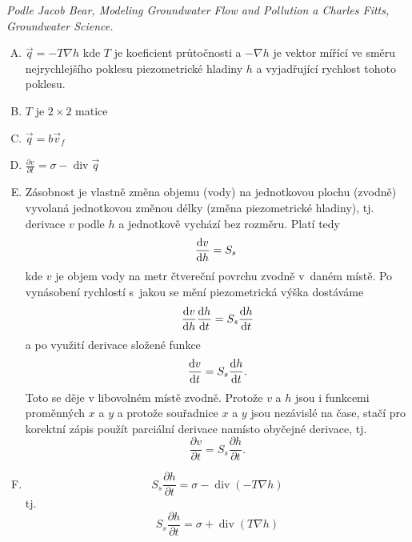 \textit{Podle Jacob Bear, Modeling Groundwater Flow and Pollution a Charles Fitts, Groundwater Science.}

\reseni

\begin{enumerate}[A)]
\item $\vec q=-T \nabla h$ kde $T$ je koeficient průtočnosti a $-\nabla h$
  je vektor mířící ve směru nejrychlejšího poklesu piezometrické
  hladiny $h$ a vyjadřující rychlost tohoto poklesu.
\item $T$ je  $2\times 2$ matice
\item $\vec q=b\vec v_f$
\item $\frac{\partial v}{\partial t}=\sigma-\mathop{\mathrm{div}}\vec q$
\item Zásobnost je vlastně změna objemu (vody) na jednotkovou plochu
  (zvodně) vyvolaná  jednotkovou změnou délky (změna piezometrické hladiny),
  tj. derivace $v$ podle $h$ a jednotkově vychází bez rozměru. Platí tedy
  \begin{equation*}
    \derivace vh=S_s \end{equation*}
  kde $v$ je objem vody na
  metr čtvereční povrchu zvodně v daném místě. Po vynásobení rychlostí s jakou se
  mění piezometrická výška dostáváme
  \begin{equation*}
    \frac{\mathrm{d}v}{\mathrm{d}h} \frac{\mathrm{d}h}{\mathrm{d}t}=S_s\frac{\mathrm{d}h}{\mathrm{d}t}
  \end{equation*}
   a po využití derivace složené funkce
  \begin{equation*}
    \frac{\mathrm{d}v}{\mathrm{d}t}=S_s\frac{\mathrm{d}h}{\mathrm{d}t}.
  \end{equation*}
  Toto se děje v libovolném místě zvodně. Protože $v$ a $h$ jsou i funkcemi proměnných $x$ a $y$ a protože souřadnice $x$ a $y$ jsou nezávislé na čase, stačí pro korektní zápis použít parciální derivace namísto obyčejné derivace, tj.
  \begin{equation*}
       \frac{\partial v}{\partial t} = S_s \frac {\partial h}{\partial t}.
     \end{equation*}
\item
  \begin{equation*}
    S_s\frac{\partial h}{\partial t}=\sigma - \mathop{\mathrm{div}} \left(-T\nabla h\right)
  \end{equation*}
  tj. 
  \begin{equation*}
    S_s\frac{\partial h}{\partial t}=\sigma + \mathop{\mathrm{div}} \left(T\nabla h\right)
  \end{equation*}

\end{enumerate}
\konec
\stranka

